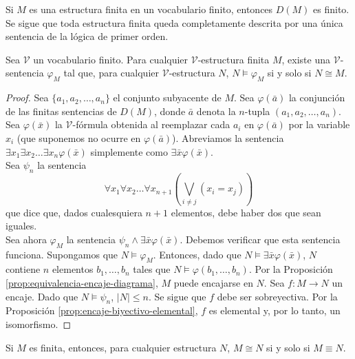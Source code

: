 \message{ !name(main.tex)}\documentclass[12pt,a4paper]{book}
\newcommand{\VV}{\mathcal{V}}
\begin{document}
    Si $M$ es una estructura finita en un vocabulario finito, entonces $D(M)$ es finito. Se sigue que toda estructura
    finita queda completamente descrita por una única sentencia de la lógica de primer orden.

    \begin{proposicion}\label{prop:sentencia-caracteriza-grafo-finito}
        Sea $\VV$ un vocabulario finito. Para cualquier $\VV$-estructura finita $M$, existe una $\VV$-sentencia
        $\varphi_{M}$ tal que, para cualquier $\VV$-estructura $N$, $N\models\varphi_{M}$ si y solo si $N\cong M$.
    \end{proposicion}
    \begin{proof}
        Sea $\{a_{1},a_{2},\dots,a_{n}\}$ el conjunto subyacente de $M$. Sea $\varphi(\bar{a})$ la conjunción de las
        finitas sentencias de $D(M)$, donde $\bar{a}$ denota la $n$-tupla $(a_{1},a_{2},\dots,a_{n})$. Sea $\varphi(\bar{x})$
        la $\VV$-fórmula obtenida al reemplazar cada $a_{i}$ en $\varphi(\bar{a})$ por la variable $x_{i}$ (que suponemos
        no ocurre en $\varphi(\bar{a})$). Abreviamos la sentencia $\exists x_{1}\exists x_{2}\dots\exists x_{n}\varphi(\bar{x})$
        simplemente como $\exists\bar{x}\varphi(\bar{x})$.\\
        Sea $\psi_{n}$ la sentencia
        \begin{equation*}
            \forall x_{1}\forall x_{2}\dots\forall x_{n+1}\left(\bigvee_{i\neq j}(x_{i}=x_{j})\right)
        \end{equation*}
        que dice que, dados cualesquiera $n+1$ elementos, debe haber dos que sean iguales.\\
        Sea ahora $\varphi_{M}$ la sentencia $\psi_{n}\wedge\exists\bar{x}\varphi(\bar{x})$. Debemos verificar que esta
        sentencia funciona. Supongamos que $N\models\varphi_{M}$. Entonces, dado que $N\models\exists\bar{x}\varphi(\bar{x})$,
        $N$ contiene $n$ elementos $b_{1},\dots,b_{n}$ tales que $N\models\varphi(b_{1},\dots,b_{n})$. Por la Proposición
        \ref{prop:equivalencia-encaje-diagrama}, $M$ puede encajarse en $N$. Sea $f:M\rightarrow N$ un encaje. Dado que
        $N\models\psi_{n}$, $|N|\leq n$. Se sigue que $f$ debe ser sobreyectiva. Por la Proposición
        \ref{prop:encaje-biyectivo-elemental}, $f$ es elemental y, por lo tanto, un isomorfismo.
    \end{proof}

    \begin{corolario}\label{cor:isomorfo-sii-equivalente-finito}
        Si $M$ es finita, entonces, para cualquier estructura $N$, $M\cong N$ si y solo si $M\equiv N$.
    \end{corolario}
\end{document}
